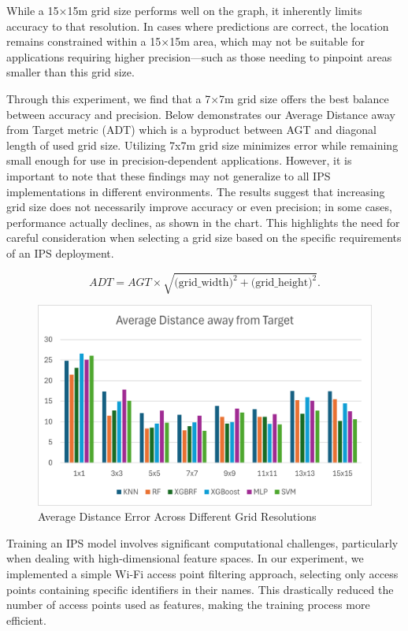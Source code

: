 \documentclass[conference]{IEEEtran}
\begin{document}
	While a 15×15m grid size performs well on the graph, it inherently limits accuracy to that resolution. In cases where predictions are correct, the location remains constrained within a 15×15m area, which may not be suitable for applications requiring higher precision—such as those needing to pinpoint areas smaller than this grid size.
	
	Through this experiment, we find that a 7×7m grid size offers the best balance between accuracy and precision. Below demonstrates our Average Distance away from Target metric (ADT) which is a byproduct between AGT and diagonal length of used grid size. Utilizing 7x7m grid size minimizes error while remaining small enough for use in precision-dependent applications. However, it is important to note that these findings may not generalize to all IPS implementations in different environments. The results suggest that increasing grid size does not necessarily improve accuracy or even precision; in some cases, performance actually declines, as shown in the chart. This highlights the need for careful consideration when selecting a grid size based on the specific requirements of an IPS deployment.
	
	\[
	ADT = AGT \times \sqrt{\text{(grid\_width)}^2 + \text{(grid\_height)}^2}.
	\]
	
	
	\begin{figure}[htbp]
		\centerline{\includegraphics[scale=0.65]{image2.png}}
		\caption{Average Distance Error Across Different Grid Resolutions}
		\label{fig:Avg_dis_err}
	\end{figure}
	
	
	
	Training an IPS model involves significant computational challenges, particularly when dealing with high-dimensional feature spaces. In our experiment, we implemented a simple Wi-Fi access point filtering approach, selecting only access points containing specific identifiers in their names. This drastically reduced the number of access points used as features, making the training process more efficient.
	
\end{document}
